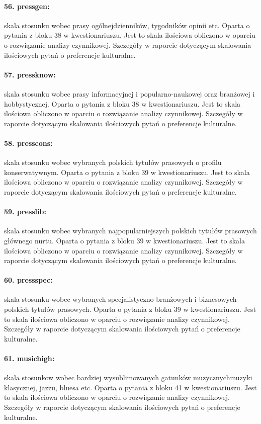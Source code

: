 \documentclass[10pt, a4paper]{article}
\begin{document}
\paragraph{56. pressgen:} skala stosunku wobec prasy ogólnej\textemdash dzienników, tygodników opinii etc. Oparta o pytania z bloku 38 w kwestionariuszu. Jest to skala ilościowa obliczono w oparciu o rozwiązanie analizy czynnikowej. Szczegóły w raporcie dotyczącym skalowania ilościowych pytań o preferencje kulturalne.
\paragraph{57. pressknow:} skala stosunku wobec prasy informacyjnej i popularno-naukowej oraz branżowej i hobbystycznej. Oparta o pytania z bloku 38 w kwestionariuszu. Jest to skala ilościowa obliczono w oparciu o rozwiązanie analizy czynnikowej. Szczegóły w raporcie dotyczącym skalowania ilościowych pytań o preferencje kulturalne.
\paragraph{58. presscons:} skala stosunku wobec wybranych polskich tytułów prasowych o profilu konserwatywnym. Oparta o pytania z bloku 39 w kwestionariuszu. Jest to skala ilościowa obliczono w oparciu o rozwiązanie analizy czynnikowej. Szczegóły w raporcie dotyczącym skalowania ilościowych pytań o preferencje kulturalne.
\paragraph{59. presslib:} skala stosunku wobec wybranych najpopularniejszych polskich tytułów prasowych głównego nurtu. Oparta o pytania z bloku 39 w kwestionariuszu. Jest to skala ilościowa obliczono w oparciu o rozwiązanie analizy czynnikowej. Szczegóły w raporcie dotyczącym skalowania ilościowych pytań o preferencje kulturalne.
\paragraph{60. pressspec:} skala stosunku wobec wybranych specjalistyczno-branżowych i biznesowych polskich tytułów prasowych. Oparta o pytania z bloku 39 w kwestionariuszu. Jest to skala ilościowa obliczono w oparciu o rozwiązanie analizy czynnikowej. Szczegóły w raporcie dotyczącym skalowania ilościowych pytań o preferencje kulturalne.
\paragraph{61. musichigh:} skala stosunkow wobec bardziej wysublimowanych gatunków muzycznych\textemdash muzyki klasycznej, jazzu, bluesa etc. Oparta o pytania z bloku 41 w kwestionariuszu. Jest to skala ilościowa obliczono w oparciu o rozwiązanie analizy czynnikowej. Szczegóły w raporcie dotyczącym skalowania ilościowych pytań o preferencje kulturalne.
\end{document}
